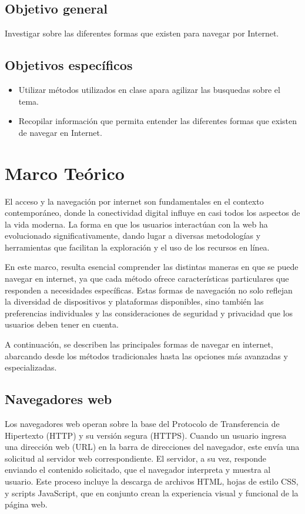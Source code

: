 \documentclass[12pt]{article}
\begin{document}
                \subsection{Objetivo general}
                        Investigar sobre las diferentes formas que existen para navegar por Internet.

                \subsection{Objetivos específicos}
                        \begin{itemize}
                                \item Utilizar métodos utilizados en clase apara agilizar las busquedas sobre el tema.
                                \item Recopilar información que permita entender las diferentes formas que existen de navegar en Internet.
                        \end{itemize}


        \newpage
        \section{Marco Teórico}
                El acceso y la navegación por internet son fundamentales en el contexto contemporáneo, donde la conectividad digital influye en casi todos los aspectos de la vida moderna. La forma en que los usuarios interactúan con la web ha evolucionado significativamente, dando lugar a diversas metodologías y herramientas que facilitan la exploración y el uso de los recursos en línea.

                En este marco, resulta esencial comprender las distintas maneras en que se puede navegar en internet, ya que cada método ofrece características particulares que responden a necesidades específicas. Estas formas de navegación no solo reflejan la diversidad de dispositivos y plataformas disponibles, sino también las preferencias individuales y las consideraciones de seguridad y privacidad que los usuarios deben tener en cuenta.

                A continuación, se describen las principales formas de navegar en internet, abarcando desde los métodos tradicionales hasta las opciones más avanzadas y especializadas.
                
                \subsection{Navegadores web}
                        Los navegadores web operan sobre la base del Protocolo de Transferencia de Hipertexto (HTTP) y su versión segura (HTTPS). Cuando un usuario ingresa una dirección web (URL) en la barra de direcciones del navegador, este envía una solicitud al servidor web correspondiente. El servidor, a su vez, responde enviando el contenido solicitado, que el navegador interpreta y muestra al usuario. Este proceso incluye la descarga de archivos HTML, hojas de estilo CSS, y scripts JavaScript, que en conjunto crean la experiencia visual y funcional de la página web.
\end{document}
